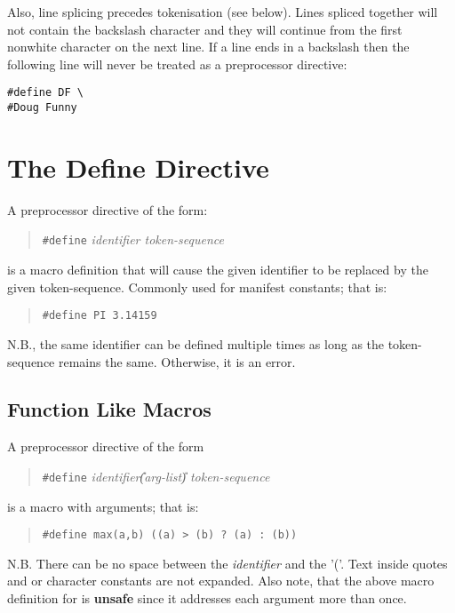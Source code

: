 Also, line splicing precedes tokenisation (see below). Lines spliced
together will not contain the backslash character and they will
continue from the first nonwhite character on the next line.  If a
line ends in a backslash then the following line will never be
treated as a preprocessor directive:

\begin{production}
\begin{verbatim}
#define DF \
#Doug Funny
\end{verbatim}
\end{production}


\section{The Define Directive}
\label{sec:Define}  

	A preprocessor directive of the form:
 \begin{quote} {\tt \#define} {\it identifier token-sequence} \end{quote} 
is a macro definition
	 that will cause the given identifier to be replaced by the
	 given token-sequence. Commonly used for manifest constants;
	 that is: \begin{quote} {\tt \#define PI 3.14159} \end{quote}
	
	N.B., the same identifier can be defined multiple times as
	long as the token-sequence remains the same.  Otherwise, it is
	an error.



\subsection{Function Like Macros}
\label{sec:FunctionMacros}

	A preprocessor directive of the form
	\begin{quote}
	{\tt \#define} {\it identifier\U{(}arg-list\U{)} token-sequence }
	\end{quote}
	is a macro with arguments; that is:
	\begin{quote} 
	{\tt \#define max(a,b)	  ((a) > (b) ? (a) : (b))} 
	\end{quote} 
 	
	N.B. There can be no space between the {\it identifier} and
	the '('. Text inside quotes and or character constants are not
	expanded.  Also note, that the above macro definition for
	 is {\bf unsafe} since it addresses each argument more
	than once.

